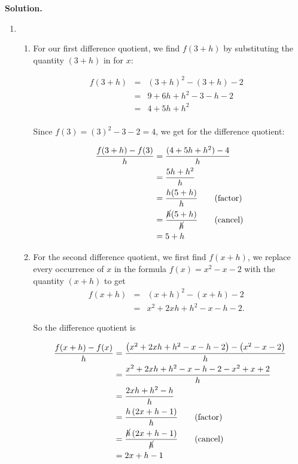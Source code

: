 \begin{ex}
\begin{enumerate}
\end{enumerate}

{\bf Solution.}
 
\begin{enumerate}

\item \begin{enumerate} \item For our first difference quotient, we find $f(3+h)$ by substituting the quantity $(3+h)$ in for $x$: 

\[ \begin{array}{rclr}  
  f(3+h) & = & (3+h)^2 - (3+h) -2 & \\ 
  & = & 9 + 6h+h^2 - 3 - h -2 & \\
 & = & 4 + 5h + h^2 & \\
 \end{array} \]

Since $f(3) = (3)^2-3-2 = 4$, we get for the difference quotient:

\begin{align*}
\dfrac{f(3+h)-f(3)}{h} & = \dfrac{(4 + 5h + h^2) -4}{h} \\
                                & = \dfrac{5h+h^2}{h} \\
                                & = \dfrac{h(5+h)}{h} \tag{factor} \\
                                & = \dfrac{\cancel{h}(5+h)}{\cancel{h}} \tag{cancel} \\
                                & = 5+h
\end{align*}				


\item For the second difference quotient, we first find $f(x+h)$, we replace every occurrence of $x$ in the formula $f(x) = x^2-x-2$ with the quantity $(x+h)$ to get \[ \begin{array}{rclr}  
 
 f(x+h) & = & (x+h)^2 - (x+h) -2 & \\ [8pt]
 & = & x^2 + 2xh + h^2 - x - h - 2.
 \end{array} \]

So the difference quotient is

\begin{align*}
\dfrac{f(x+h)-f(x)}{h} & = \dfrac{\left(x^2+2xh+h^2-x-h-2 \right)-\left(x^{2}-x-2 \right)}{h} \\
& = \dfrac{x^2+2xh+h^2-x-h-2-x^2+x+2}{h} \\
& = \dfrac{2xh+h^2-h}{h} \\ 
	& = \dfrac{h \left(2x+h-1\right)}{h} \tag{factor} \\
	& = \dfrac{\cancel{h} \left(2x+h-1\right)}{\cancel{h}} \tag{cancel} \\
& = 2x+h-1
\end{align*} 


\end{enumerate}
\end{enumerate}
\end{ex}
